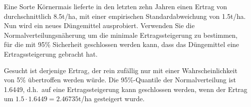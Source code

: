 Eine Sorte Körnermais lieferte in den letzten zehn Jahren
einen Ertrag von durchschnittlich
8.5t/ha, mit einer empirischen Standardabweichung von 1.5t/ha.
Nun wird ein neues Düngemittel ausprobiert.
Verwenden Sie die Normalverteilungsnäherung um die minimale
Ertragssteigerung zu bestimmen, für die mit 95\% Sicherheit geschlossen
werden kann, dass das Düngemittel eine Ertragssteigerung gebracht hat.

\begin{loesung}
Gesucht ist derjenige Ertrag, der rein zufällig nur mit einer
Wahrscheinlichkeit
von 5\% übertroffen werden würde.
Die 95\%-Quantile der
Normalverteilung ist 1.6449, d.h.~auf eine Ertragssteigerung kann
geschlossen werden, wenn der Ertrag um
$1.5\cdot 1.6449=2.46735$t/ha gesteigert wurde.
\end{loesung}


